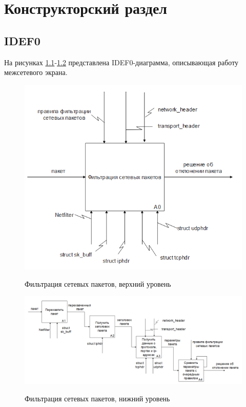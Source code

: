\chapter{Конструкторский раздел}

\section{IDEF0}

На рисунках \ref{img:IDEF00}-\ref{img:IDEF02} представлена IDEF0-диаграмма, описывающая работу межсетевого экрана.



\begin{figure}[h]
	\begin{center}
		{\includegraphics[scale = 1.5]{inc/img/IDEF00.png}}
		\caption{Фильтрация сетевых пакетов, верхний уровень}
		\label{img:IDEF00}
	\end{center}
\end{figure}


\clearpage
\begin{figure}[h!]
	\begin{center}
		{\includegraphics[scale = 0.9]{inc/img/IDEF02.png}}
		\caption{Фильтрация сетевых пакетов, нижний уровень}
		\label{img:IDEF02}
	\end{center}
\end{figure}

